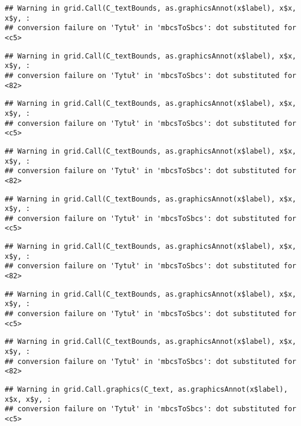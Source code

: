 \documentclass[
]{book}
\begin{document}
\begin{verbatim}
## Warning in grid.Call(C_textBounds, as.graphicsAnnot(x$label), x$x, x$y, :
## conversion failure on 'Tytuł' in 'mbcsToSbcs': dot substituted for <c5>
\end{verbatim}

\begin{verbatim}
## Warning in grid.Call(C_textBounds, as.graphicsAnnot(x$label), x$x, x$y, :
## conversion failure on 'Tytuł' in 'mbcsToSbcs': dot substituted for <82>
\end{verbatim}

\begin{verbatim}
## Warning in grid.Call(C_textBounds, as.graphicsAnnot(x$label), x$x, x$y, :
## conversion failure on 'Tytuł' in 'mbcsToSbcs': dot substituted for <c5>
\end{verbatim}

\begin{verbatim}
## Warning in grid.Call(C_textBounds, as.graphicsAnnot(x$label), x$x, x$y, :
## conversion failure on 'Tytuł' in 'mbcsToSbcs': dot substituted for <82>
\end{verbatim}

\begin{verbatim}
## Warning in grid.Call(C_textBounds, as.graphicsAnnot(x$label), x$x, x$y, :
## conversion failure on 'Tytuł' in 'mbcsToSbcs': dot substituted for <c5>
\end{verbatim}

\begin{verbatim}
## Warning in grid.Call(C_textBounds, as.graphicsAnnot(x$label), x$x, x$y, :
## conversion failure on 'Tytuł' in 'mbcsToSbcs': dot substituted for <82>
\end{verbatim}

\begin{verbatim}
## Warning in grid.Call(C_textBounds, as.graphicsAnnot(x$label), x$x, x$y, :
## conversion failure on 'Tytuł' in 'mbcsToSbcs': dot substituted for <c5>
\end{verbatim}

\begin{verbatim}
## Warning in grid.Call(C_textBounds, as.graphicsAnnot(x$label), x$x, x$y, :
## conversion failure on 'Tytuł' in 'mbcsToSbcs': dot substituted for <82>
\end{verbatim}

\begin{verbatim}
## Warning in grid.Call.graphics(C_text, as.graphicsAnnot(x$label), x$x, x$y, :
## conversion failure on 'Tytuł' in 'mbcsToSbcs': dot substituted for <c5>
\end{verbatim}
\end{document}
